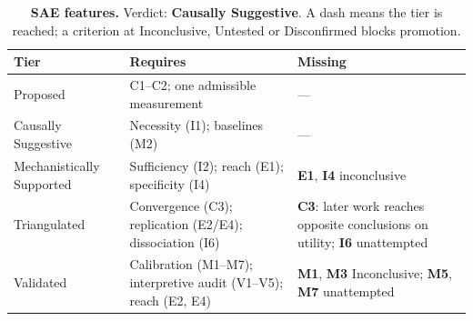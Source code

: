 \begin{table}[H]
\centering
\footnotesize
\caption{\textbf{SAE features.} Verdict: \textbf{Causally Suggestive}. A dash means the tier is reached; a criterion at
Inconclusive, Untested or Disconfirmed blocks promotion.}
\label{tab:sae-verdict}
\renewcommand{\arraystretch}{1.18}
\begin{tabular}{@{}l>{\raggedright\arraybackslash}p{3.6cm}>{\raggedright\arraybackslash}p{4.4cm}@{}}
\toprule
\textbf{Tier} & \textbf{Requires} & \textbf{Missing} \\
\midrule
Proposed & C1--C2; one admissible measurement & --- \\
\addlinespace[2pt]
Causally Suggestive & Necessity (I1); baselines (M2) & --- \\
\addlinespace[2pt]
Mechanistically Supported & Sufficiency (I2); reach (E1); specificity (I4) & \textbf{E1}, \textbf{I4} inconclusive \\
\addlinespace[2pt]
Triangulated & Convergence (C3); replication (E2/E4); dissociation (I6) & \textbf{C3}: later work reaches opposite conclusions on utility; \textbf{I6} unattempted \\
\addlinespace[2pt]
Validated & Calibration (M1--M7); interpretive audit (V1--V5); reach (E2, E4) & \textbf{M1}, \textbf{M3} Inconclusive; \textbf{M5}, \textbf{M7} unattempted \\
\bottomrule
\end{tabular}
\end{table}
